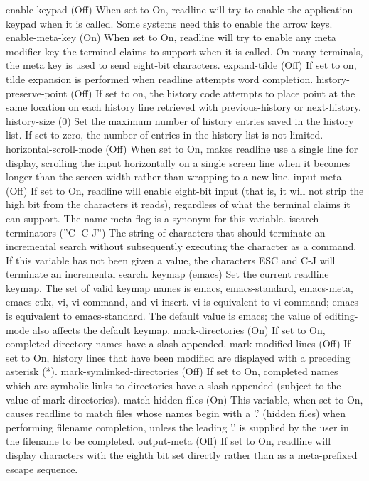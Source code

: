 enable-keypad (Off)
When set to On, readline will try to enable the application keypad when it is called. Some systems need this to enable the arrow keys.
enable-meta-key (On)
When set to On, readline will try to enable any meta modifier key the terminal claims to support when it is called. On many terminals, the meta key is used to send eight-bit characters.
expand-tilde (Off)
If set to on, tilde expansion is performed when readline attempts word completion.
history-preserve-point (Off)
If set to on, the history code attempts to place point at the same location on each history line retrieved with previous-history or next-history.
history-size (0)
Set the maximum number of history entries saved in the history list. If set to zero, the number of entries in the history list is not limited.
horizontal-scroll-mode (Off)
When set to On, makes readline use a single line for display, scrolling the input horizontally on a single screen line when it becomes longer than the screen width rather than wrapping to a new line.
input-meta (Off)
If set to On, readline will enable eight-bit input (that is, it will not strip the high bit from the characters it reads), regardless of what the terminal claims it can support. The name meta-flag is a synonym for this variable.
isearch-terminators (''C-[C-J'')
The string of characters that should terminate an incremental search without subsequently executing the character as a command. If this variable has not been given a value, the characters ESC and C-J will terminate an incremental search.
keymap (emacs)
Set the current readline keymap. The set of valid keymap names is emacs, emacs-standard, emacs-meta, emacs-ctlx, vi, vi-command, and vi-insert. vi is equivalent to vi-command; emacs is equivalent to emacs-standard. The default value is emacs; the value of editing-mode also affects the default keymap.
mark-directories (On)
If set to On, completed directory names have a slash appended.
mark-modified-lines (Off)
If set to On, history lines that have been modified are displayed with a preceding asterisk (*).
mark-symlinked-directories (Off)
If set to On, completed names which are symbolic links to directories have a slash appended (subject to the value of mark-directories).
match-hidden-files (On)
This variable, when set to On, causes readline to match files whose names begin with a '.' (hidden files) when performing filename completion, unless the leading '.' is supplied by the user in the filename to be completed.
output-meta (Off)
If set to On, readline will display characters with the eighth bit set directly rather than as a meta-prefixed escape sequence.
